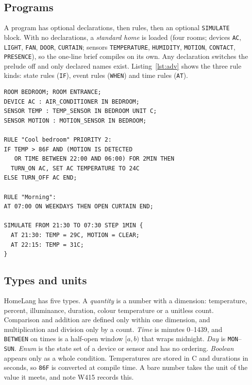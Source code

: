 \documentclass[conference]{IEEEtran}
\newcommand{\code}[1]{\texttt{#1}}
\newcommand{\degC}{\textdegree{}C}
\begin{document}
\subsection{Programs}
A program has optional declarations, then rules, then an optional \code{SIMULATE} block. With no declarations, a \emph{standard home} is loaded (four rooms; devices \code{AC}, \code{LIGHT}, \code{FAN}, \code{DOOR}, \code{CURTAIN}; sensors \code{TEMPERATURE}, \code{HUMIDITY}, \code{MOTION}, \code{CONTACT}, \code{PRESENCE}), so the one-line brief compiles on its own. Any declaration switches the prelude off and only declared names exist. Listing~\ref{lst:adv} shows the three rule kinds: state rules (\code{IF}), event rules (\code{WHEN}) and time rules (\code{AT}).

\begin{lstlisting}[language=HomeLang,caption={Extract of \code{examples/advanced.home}.},label={lst:adv}]
ROOM BEDROOM; ROOM ENTRANCE;
DEVICE AC : AIR_CONDITIONER IN BEDROOM;
SENSOR TEMP : TEMP_SENSOR IN BEDROOM UNIT C;
SENSOR MOTION : MOTION_SENSOR IN BEDROOM;

RULE "Cool bedroom" PRIORITY 2:
IF TEMP > 86F AND (MOTION IS DETECTED
   OR TIME BETWEEN 22:00 AND 06:00) FOR 2MIN THEN
  TURN_ON AC, SET AC TEMPERATURE TO 24C
ELSE TURN_OFF AC END;

RULE "Morning":
AT 07:00 ON WEEKDAYS THEN OPEN CURTAIN END;

SIMULATE FROM 21:30 TO 07:30 STEP 1MIN {
  AT 21:30: TEMP = 29C, MOTION = CLEAR;
  AT 22:15: TEMP = 31C;
}
\end{lstlisting}

\subsection{Types and units}
HomeLang has five types. A \emph{quantity} is a number with a dimension: temperature, percent, illuminance, duration, colour temperature or a unitless count. Comparison and addition are defined only within one dimension, and multiplication and division only by a count. \emph{Time} is minutes 0--1439, and \code{BETWEEN} on times is a half-open window $[a, b)$ that wraps midnight. \emph{Day} is \code{MON}--\code{SUN}. \emph{Enum} is the state set of a device or sensor and has no ordering. \emph{Boolean} appears only as a whole condition. Temperatures are stored in \degC{} and durations in seconds, so \code{86F} is converted at compile time. A bare number takes the unit of the value it meets, and note W415 records this.
\end{document}

